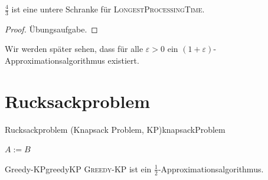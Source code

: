 \documentclass[language=ngerman,algolist]{TemplateLecture}
\begin{document}
\begin{rmk}
    $\frac{4}{3}$ ist eine untere Schranke für \textsc{LongestProcessingTime}.
    \begin{proof}
        Übungsaufgabe.
    \end{proof}
    Wir werden später sehen, dass für alle $\varepsilon > 0$ ein $(1+\varepsilon)$-Approximationsalgorithmus existiert.
\end{rmk}



\section{Rucksackproblem}

\begin{prob}{Rucksackproblem (Knapsack Problem, KP)}{knapsackProblem}
\end{prob}

\begin{algorithm}
    \caption{\textsc{Greedy-KP}}\label{alg:greedyKP}
    \begin{algorithmic}[1]
        \EndWhile{}
            \Else{} $A := B$
        \EndIf{}
    \end{algorithmic}
\end{algorithm}

\begin{thm}{Greedy-KP}{greedyKP}
    \textsc{Greedy-KP} ist ein $\frac{1}{2}$-Approximationsalgorithmus.
\end{thm}
\end{document}
